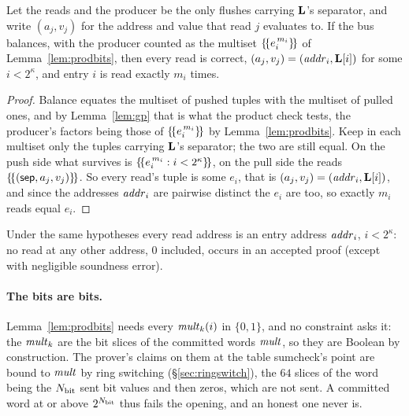 \begin{theorem}\label{thm:omc}
Let the reads and the producer be the only flushes carrying $\mathbf{L}$'s separator, and write $(a_j,v_j)$ for the address and value that read $j$ evaluates to. If the bus balances, with the producer counted as the multiset $\{\!\{e_i^{\,m_i}\}\!\}$ of Lemma~\ref{lem:prodbits}, then every read is correct, $(a_j,v_j)=(\mathit{addr}_i,\mathbf{L}[i])$ for some $i<2^{\kappa}$, and entry $i$ is read exactly $m_i$ times.
\end{theorem}

\begin{proof}
Balance equates the multiset of pushed tuples with the multiset of pulled ones, and by Lemma~\ref{lem:gp} that is what the product check tests, the producer's factors being those of $\{\!\{e_i^{\,m_i}\}\!\}$ by Lemma~\ref{lem:prodbits}. Keep in each multiset only the tuples carrying $\mathbf{L}$'s separator; the two are still equal. On the push side what survives is $\{\!\{e_i^{\,m_i}:i<2^{\kappa}\}\!\}$, on the pull side the reads $\{\!\{( \mathsf{sep},a_j,v_j )\}\!\}$. So every read's tuple is some $e_i$, that is $(a_j,v_j)=(\mathit{addr}_i,\mathbf{L}[i])$, and since the addresses $\mathit{addr}_i$ are pairwise distinct the $e_i$ are too, so exactly $m_i$ reads equal $e_i$.
\end{proof}

\begin{corollary}\label{cor:addrrange}
Under the same hypotheses every read address is an entry address $\mathit{addr}_i$, $i<2^{\kappa}$: no read at any other address, $0$ included, occurs in an accepted proof (except with negligible soundness error).
\end{corollary}

\paragraph{The bits are bits.} Lemma~\ref{lem:prodbits} needs every $\mathit{mult}_{k}(i)$ in $\{0,1\}$, and no constraint asks it: the $\mathit{mult}_{k}$ are the bit slices of the committed words $\mathit{mult}$, so they are Boolean by construction. The prover's claims on them at the table sumcheck's point are bound to $\mathit{mult}$ by ring switching (\S\ref{sec:ringswitch}), the $64$ slices of the word being the $N_{\mathrm{bit}}$ sent bit values and then zeros, which are not sent. A committed word at or above $2^{N_{\mathrm{bit}}}$ thus fails the opening, and an honest one never is.

